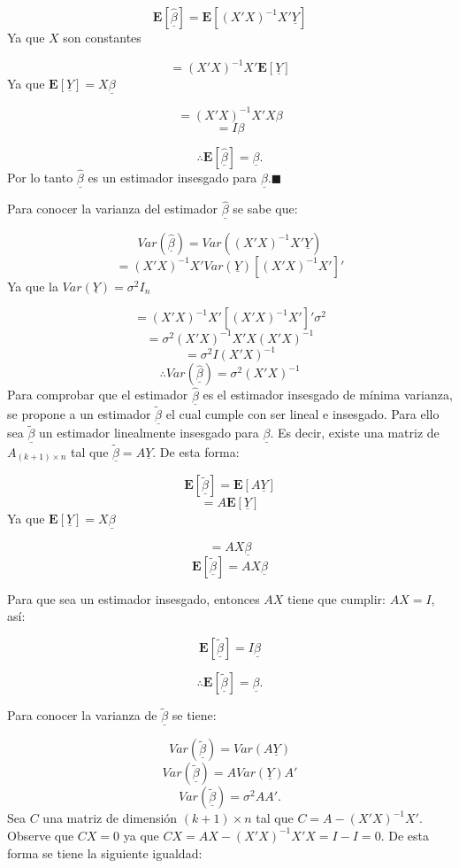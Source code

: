 \documentclass[
  a4paper,
  oneside,
  openany]{book}
\begin{document}
\[\mathbf{E}[\underline{\hat{\beta}}]=\mathbf{E}[(X'X)^{-1}X'\underline{Y}]\]
Ya que \(X\) son constantes

\[=(X'X)^{-1}X'\mathbf{E}[\underline{Y}]\]
Ya que \(\mathbf{E}[\underline{Y}]=X\underline{\beta}\)

\[=(X'X)^{-1}X'X\beta\]
\[=I\beta\]

\[\therefore \mathbf{E}[\underline{\hat{\beta}}]=\underline{\beta}.\]
Por lo tanto \(\underline{\hat{\beta}}\) es un estimador insesgado para \(\underline{\beta}\).\(\blacksquare\)

Para conocer la varianza del estimador \(\underline{\hat{\beta}}\) se sabe que:

\[Var(\underline{\hat{\beta}})=Var\left( (X'X)^{-1}X'\underline{Y}\right)\]
\[=(X'X)^{-1}X'Var(\underline{Y})[(X'X)^{-1}X']'\]
Ya que la \(Var(\underline{Y})=\sigma^2I_{n}\)

\[=(X'X)^{-1}X'[(X'X)^{-1}X']'\sigma^2\]
\[=\sigma^2(X'X)^{-1}X'X(X'X)^{-1}\]
\[=\sigma^2I(X'X)^{-1}\]
\[\therefore Var(\underline{\hat{\beta}})=\sigma^2(X'X)^{-1}\]
Para comprobar que el estimador \(\underline{\hat{\beta}}\) es el estimador insesgado de mínima varianza, se propone a un estimador \(\underline{\tilde{\beta}}\) el cual cumple con ser lineal e insesgado. Para ello sea \(\underline{\tilde{\beta}}\) un estimador linealmente insesgado para \(\underline{\beta}\). Es decir, existe una matriz de \(A_{(k+1)\times n}\) tal que \(\underline{\tilde{\beta}}=A \underline{Y}.\)
De esta forma:

\[\mathbf{E}\left[\underline{\tilde{\beta}}\right]=\mathbf{E}\left[ A\underline{Y} \right]\]
\[=A \mathbf{E}[\underline{Y}]\]
Ya que \(\mathbf{E}[\underline{Y}]=X\underline{\beta}\)

\[=AX\underline{\beta}\]
\[\mathbf{E}\left[\underline{\tilde{\beta}}\right]=AX\underline{\beta}\]

Para que sea un estimador insesgado, entonces \(AX\) tiene que cumplir: \(AX=I\), así:

\[\mathbf{E}\left[\underline{\tilde{\beta}}\right]=I\underline{\beta}\]

\[\therefore \mathbf{E}\left[\underline{\tilde{\beta}}\right]=\underline{\beta}.\]

Para conocer la varianza de \(\underline{\tilde{\beta}}\) se tiene:

\[Var\left(\underline{\tilde{\beta}}\right)= Var(A\underline{Y})\]
\[Var\left(\underline{\tilde{\beta}}\right)=A Var(\underline{Y})A'\]
\[Var\left(\underline{\tilde{\beta}}\right)=\sigma^2 AA'.\]
Sea \(C\) una matriz de dimensión \((k+1) \times n\) tal que \(C=A-(X'X)^{-1}X'\). Observe que \(CX=0\) ya que \(CX=AX-(X'X)^{-1}X'X=I-I=0.\)
De esta forma se tiene la siguiente igualdad:
\end{document}
